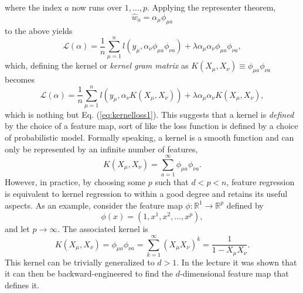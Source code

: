 \documentclass{article}
\begin{document}
where the index $a$ now runs over $1,\dots,p$. Applying the representer theorem,
\begin{equation}
    \hat{w}_a
    =
    \alpha_{\mu}\phi_{\mu a}
\end{equation}
to the above yields
\begin{equation}
    \mathcal{L}(\alpha) =
    \frac{1}{n}\sum_{\mu = 1}^{n}
    l(y_{\mu}, \alpha_{\nu}\phi_{\mu a}\phi_{\nu a})
    + \lambda
    \alpha_{\mu}\alpha_{\nu}\phi_{\mu a}\phi_{\nu a},
\end{equation}
which, defining the kernel or \emph{kernel gram matrix} as $K(X_{\mu},X_{\nu}) \equiv \phi_{\mu a}\phi_{\nu a}$ becomes
\begin{equation}
    \mathcal{L}(\alpha) =
    \frac{1}{n}\sum_{\mu = 1}^{n}
    l(y_{\mu}, \alpha_{\nu}K(X_{\mu},X_{\nu}))
    + \lambda
    \alpha_{\mu}\alpha_{\nu}K(X_{\mu},X_{\nu}),
\end{equation}
which is nothing but Eq. (\ref{eq:kernelloss1}). This suggests that a kernel is \emph{defined} by the choice of a feature map, sort of like the loss function is defined by a choice of probabilistic model. Formally speaking, a kernel is a smooth function and can only be represented by an infinite number of features,
\begin{equation}
    K(X_{\mu},X_{\nu}) = \sum_{a=1}^{\infty} \phi_{\mu a}\phi_{\nu a}.
\end{equation}
However, in practice, by choosing some $p$ such that $d < p < n$, feature regression is equivalent to kernel regression to within a good degree and retains its useful aspects.
As an example, consider the feature map $\phi: \mathbb{R}^1 \rightarrow \mathbb{R}^p$ defined by
\begin{equation}
    \phi(x)
    =
    (1,x^1,x^2,\dots,x^p),
\end{equation}
and let $p\rightarrow\infty$. The associated kernel is
\begin{equation}
    K(X_{\mu},X_{\nu})
    =
    \phi_{\mu a}\phi_{\nu a}
    =
    \sum_{k=1}^{\infty}
    (X_{\mu}X_{\nu})^k
    =
    \frac{1}{1-X_{\mu}X_{\nu}}.
\end{equation}
This kernel can be trivially generalized to $d>1$. In the lecture it was shown that it can then be backward-engineered to find the $d$-dimensional feature map that defines it.
\end{document}
